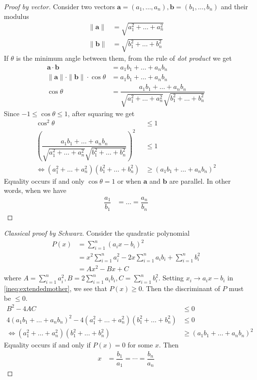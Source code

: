 \documentclass{subfile}
\begin{document}
		\begin{proof}[\itshape Proof by vector]
			Consider two vectors $\mathbf{a}=(a_1,\ldots,a_n),\mathbf{b}=(b_1,\ldots,b_n)$ and their modulus
				\begin{align*}
					\| \mathbf{a}\|
						& = \sqrt{a_1^2+\ldots+a_n^2}\\
					\| \mathbf{b}\|
						& = \sqrt{b_1^2+\ldots+b_n^2}
				\end{align*}
			If $\theta$ is the minimum angle between them, from the rule of \textit{dot product} we get
				\begin{align*}
					\mathbf{a}\cdot\mathbf{b}
						& = a_1b_1+\ldots+a_nb_n\\
					\| \mathbf{a}\| \cdot\| \mathbf{b}\| \cdot\cos\theta
						& = a_1b_1+\ldots+a_nb_n\\
					\cos{\theta}
						& = \dfrac{a_1b_1+\ldots+a_nb_n}{\sqrt{a_1^2+\ldots+a_n^2}\sqrt{b_1^2+\ldots+b_n^2}}
				\end{align*}
			Since $-1\leq\cos\theta\leq1$, after squaring we get
				\begin{align*}
					\cos^2\theta
						& \leq1\\
					\left(\dfrac{a_1b_1+\ldots+a_nb_n}{\sqrt{a_1^2+\ldots+a_n^2}\sqrt{b_1^2+\ldots+b_n^2}}\right)^2
						& \leq1\\
					\iff (a_1^2+\ldots+a_n^2)(b_1^2+\ldots+b_n^2)
						& \geq(a_1b_1+\ldots+a_nb_n)^2
				\end{align*}
			Equality occurs if and only $\cos\theta=1$ or when $\mathbf{a}$ and $\mathbf{b}$ are parallel. In other words, when we have
				\begin{align*}
					\dfrac{a_1}{b_1}& = \ldots=\dfrac{a_n}{b_n}
				\end{align*}
		\end{proof}

		\begin{proof}[\itshape Classical proof by Schwarz]
			Consider the quadratic polynomial
				\begin{align*}
					P(x)
						& = \sum_{i=1}^n(a_ix-b_i)^2\\
						& = x^2\sum_{i=1}^na_i^2-2x\sum_{i=1}^na_ib_i+\sum_{i=1}^nb_i^2\\
						& = Ax^2-Bx+C
				\end{align*}
			where $A=\sum_{i=1}^na_i^2,B=2\sum_{i=1}^na_ib_i,C=\sum_{i=1}^nb_i^2$. Setting $x_i\to a_ix-b_i$ in \ref{ineq:extendedmother}, we see that $P(x)\geq0$. Then the discriminant of $P$ must be $\leq0$.
				\begin{align*}
					B^2-4AC
						& \leq0\\
					4(a_1b_1+\ldots+a_nb_n)^2-4(a_1^2+\ldots+a_n^2)(b_1^2+\ldots+b_n^2)
						& \leq0\\
					\iff (a_1^2+\ldots+a_n^2)(b_1^2+\ldots+b_n^2)
						& \geq(a_1b_1+\ldots+a_nb_n)^2
				\end{align*}
			Equality occurs if and only if $P(x)=0$ for some $x$. Then
				\begin{align*}
					x
						& = \dfrac{b_1}{a_1}=\cdots=\dfrac{b_n}{a_n}
				\end{align*}
		\end{proof}
\end{document}
